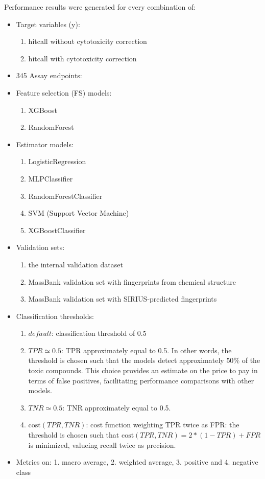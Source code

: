 Performance results were generated for every combination of:

\begin{itemize}
  \item Target variables (y):
  \begin{enumerate}
    \item hitcall without cytotoxicity correction
    \item hitcall with cytotoxicity correction
  \end{enumerate}
  \item 345 Assay endpoints:
  \item Feature selection (FS) models:
    \begin{enumerate}
      \item XGBoost
      \item RandomForest
    \end{enumerate}
    \item Estimator models:
    \begin{enumerate}
      \item LogisticRegression
      \item MLPClassifier
      \item RandomForestClassifier
      \item SVM (Support Vector Machine)
      \item XGBoostClassifier
    \end{enumerate}
  \item Validation sets:
    \begin{enumerate}
      \item the internal validation dataset 
      \item MassBank validation set with fingerprints from chemical structure
      \item MassBank validation set with SIRIUS-predicted fingerprints
    \end{enumerate}
  \item Classification thresholds:
    \begin{enumerate}
      \item $default$: classification threshold of 0.5
      \item $TPR \simeq 0.5$: TPR approximately equal to 0.5. In other words, the threshold is chosen such that the models detect approximately $50\%$ of the toxic compounds. This choice provides an estimate on the price to pay in terms of false positives, facilitating performance comparisons with other models.
      \item $TNR \simeq 0.5$: TNR approximately equal to 0.5.
      \item $\text{cost}(TPR, TNR)$: cost function weighting TPR twice as FPR: the threshold is chosen such that $\text{cost}(TPR, TNR) = 2 * (1 - TPR) + FPR$ is minimized, valueing recall twice as precision.
    \end{enumerate}
  \item Metrics on: 1. macro average, 2. weighted average, 3. positive and 4. negative class
\end{itemize}

